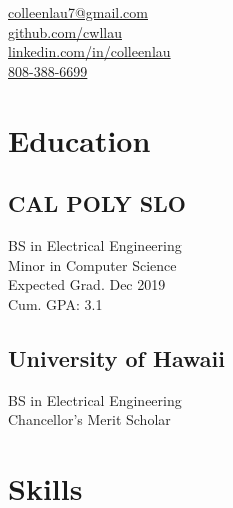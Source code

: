 \documentclass[]{wow}
\begin{document}
%
%
\begin{flushright}
{
	\faEnvelope \href{mailto:colleenlau7@gmail.com}{ colleenlau7@gmail.com}\\
	\faGithub \href{https://github.com/cwllau}{   github.com/cwllau}\\
	\faLinkedinSquare \href{https://www.linkedin.com/in/colleenlau}
  {linkedin.com/in/colleenlau}\\
  \faPhone \href{https://github.com/cwllau}{ 808-388-6699}
}
\end{flushright}
    
%
%
\begin{minipage}[t]{0.34\textwidth} 

\section{Education} 

\subsection{CAL POLY SLO}
BS in Electrical Engineering \\
Minor in Computer Science \\
Expected Grad. Dec 2019 \\
Cum. GPA: 3.1\\
\sectionsep

\subsection{University of Hawaii}
BS in Electrical Engineering \\
Chancellor's Merit Scholar \\
\sectionsep

\section{Skills}


\end{minipage}
\end{document}
